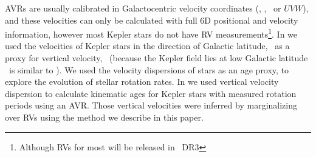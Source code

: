 AVRs are usually calibrated in Galactocentric velocity coordinates (\vx, \vy,
\vz\ or $UVW$), and these velocities can only be calculated with full 6D
positional and velocity information, however most Kepler stars do not
have RV measurements\footnote{Although RVs for most will be released in \gaia\
DR3}.
In \citet{angus2020} we used the velocities of Kepler stars in the direction
of Galactic latitude, \vb\, as a proxy for vertical velocity, \vz\ (because
the Kepler field lies at low Galactic latitude \vb\ is similar to \vz).
We used the velocity dispersions of stars as an age proxy, to explore the
evolution of stellar rotation rates.
In \citet{lu2021} we used vertical velocity dispersion to calculate kinematic
ages for Kepler stars with measured rotation periods using an AVR.
Those vertical velocities were inferred by marginalizing over RVs using the
method we describe in this paper.

